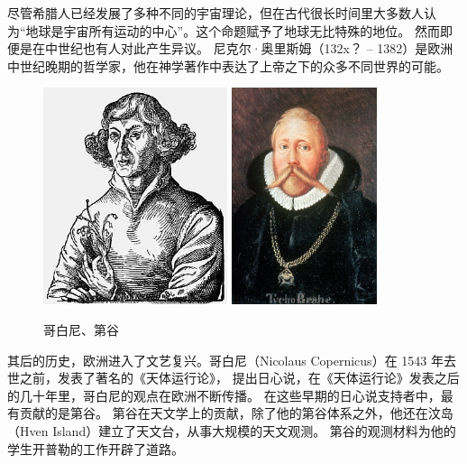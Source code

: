\documentclass[a4paper,10.5pt]{book}
\begin{document}
尽管希腊人已经发展了多种不同的宇宙理论，但在古代很长时间里大多数人认为“地球是宇宙所有运动的中心”。这个命题赋予了地球无比特殊的地位。
然而即便是在中世纪也有人对此产生异议。 尼克尔·奥里斯姆（132x？ – 1382）是欧洲中世纪晚期的哲学家，他在神学著作中表达了上帝之下的众多不同世界的可能。

\begin{figure}[ht]
\centering
\includegraphics[height=2.5in]{images/1_05-Mikolaj_Kopernik.jpg}
\includegraphics[height=2.5in]{images/1_08-Tycho_Brahe.jpg}
\caption{哥白尼、第谷}
\end{figure}

其后的历史，欧洲进入了文艺复兴。哥白尼（Nicolaus Copernicus）在 1543 年去世之前，发表了著名的《天体运行论》，
提出日心说，在《天体运行论》发表之后的几十年里，哥白尼的观点在欧洲不断传播。
在这些早期的日心说支持者中，最有贡献的是第谷。
第谷在天文学上的贡献，除了他的第谷体系之外，他还在汶岛（Hven Island）建立了天文台，从事大规模的天文观测。
第谷的观测材料为他的学生开普勒的工作开辟了道路。
\end{document}
